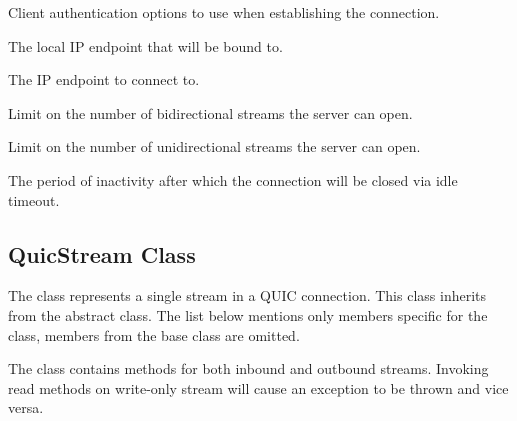 \begin{description}

     Client authentication options to use when establishing the connection.

     The local IP endpoint that will be bound to.

     The IP endpoint to connect to.

     Limit on the number of bidirectional streams the server can open.

     Limit on the number of unidirectional streams the server can open.

     The period of inactivity after which the connection will be closed via idle timeout.

\end{description}

\subsection{QuicStream Class}

The  class represents a single stream in a QUIC connection. This class inherits
from the abstract  class. The list below mentions only members specific for the  class, members from the  base class are omitted.

The class contains methods for both inbound and outbound streams. Invoking read methods on
write-only stream will cause an exception to be thrown and vice versa.

